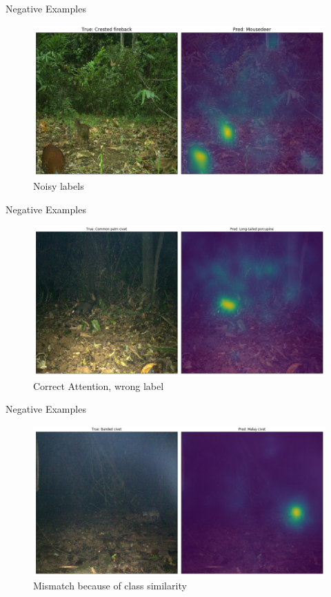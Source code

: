 \documentclass[10pt]{beamer}
\begin{document}
\begin{frame}{Negative Examples}
	\centering
	\begin{figure}
		\includegraphics[width=\columnwidth]{images/Attention_wrong_right.png}
		\caption{Noisy labels}
	\end{figure}
\end{frame}


\begin{frame}{Negative Examples}
	\centering
	\begin{figure}
		\includegraphics[width=\columnwidth]{images/Attention_wrong.png}
		\caption{Correct Attention, wrong label}
	\end{figure}
\end{frame}


\begin{frame}{Negative Examples}
	\centering
	\begin{figure}
		\includegraphics[width=\columnwidth]{images/mismatch.png}
		\caption{Mismatch because of class similarity}
	\end{figure}
\end{frame}
\end{document}
